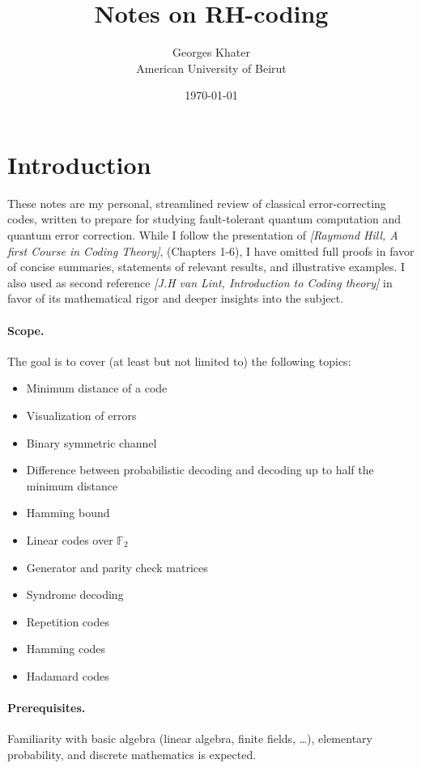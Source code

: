 \documentclass[11pt,a4paper]{article}
\title{\LARGE\bfseries Notes on RH-coding}
\author{Georges Khater \\ \small American University of Beirut}
\date{\today}
\theoremstyle{definition}
\theoremstyle{plain}
\theoremstyle{remark}
\begin{document}
\maketitle
\tableofcontents
\bigskip

\section{Introduction}
\label{sec:intro}
These notes are my personal, streamlined review of classical error-correcting codes, written to prepare 
for studying fault-tolerant quantum computation and quantum error correction. 
While I follow the presentation of \emph{[Raymond Hill, \emph{A first Course in Coding Theory}]}, (Chapters 1-6), I have 
omitted full proofs in favor of concise summaries, statements of relevant results, and illustrative examples. 
I also used as second reference \emph{[J.H van Lint, \emph{Introduction to Coding theory}]} in favor of its mathematical rigor and deeper insights into the subject.

\paragraph{Scope.}
The goal is to cover (at least but not limited to) the following topics: 
\begin{itemize}[nosep]
    \item Minimum distance of a code 
    \item Visualization of errors
    \item Binary symmetric channel
    \item Difference between probabilistic decoding and decoding up to half the minimum distance
    \item Hamming bound
    \item Linear codes over $\mathbb{F}_2$
    \item Generator and parity check matrices
    \item Syndrome decoding
    \item Repetition codes
    \item Hamming codes
    \item Hadamard codes
\end{itemize}

\paragraph{Prerequisites.}
Familiarity with basic algebra (linear algebra, finite fields, \ldots), elementary probability, and discrete mathematics is expected. 
\end{document}
